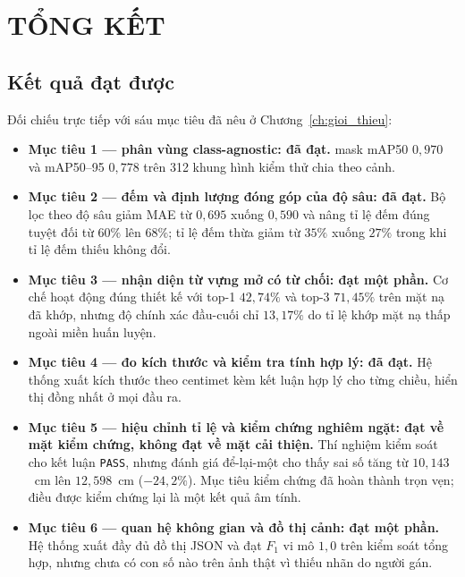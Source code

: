 \chapter{TỔNG KẾT}
\label{ch:tong_ket}

\section{Kết quả đạt được}

Đối chiếu trực tiếp với sáu mục tiêu đã nêu ở Chương~\ref{ch:gioi_thieu}:

\begin{itemize}[leftmargin=1.5cm]
\item \textbf{Mục tiêu 1 --- phân vùng class-agnostic: đã đạt.} mask mAP50 $0{,}970$ và mAP50--95
$0{,}778$ trên 312 khung hình kiểm thử chia theo cảnh.

\item \textbf{Mục tiêu 2 --- đếm và định lượng đóng góp của độ sâu: đã đạt.} Bộ lọc theo độ sâu
giảm MAE từ $0{,}695$ xuống $0{,}590$ và nâng tỉ lệ đếm đúng tuyệt đối từ $60\%$ lên $68\%$; tỉ
lệ đếm thừa giảm từ $35\%$ xuống $27\%$ trong khi tỉ lệ đếm thiếu không đổi.

\item \textbf{Mục tiêu 3 --- nhận diện từ vựng mở có từ chối: đạt một phần.} Cơ chế hoạt động
đúng thiết kế với top-1 $42{,}74\%$ và top-3 $71{,}45\%$ trên mặt nạ đã khớp, nhưng độ chính xác
đầu-cuối chỉ $13{,}17\%$ do tỉ lệ khớp mặt nạ thấp ngoài miền huấn luyện.

\item \textbf{Mục tiêu 4 --- đo kích thước và kiểm tra tính hợp lý: đã đạt.} Hệ thống xuất kích
thước theo centimet kèm kết luận hợp lý cho từng chiều, hiển thị đồng nhất ở mọi đầu ra.

\item \textbf{Mục tiêu 5 --- hiệu chỉnh tỉ lệ và kiểm chứng nghiêm ngặt: đạt về mặt kiểm chứng,
không đạt về mặt cải thiện.} Thí nghiệm kiểm soát cho kết luận \texttt{PASS}, nhưng đánh giá
để-lại-một cho thấy sai số tăng từ $10{,}143$~cm lên $12{,}598$~cm ($-24{,}2\%$). Mục tiêu kiểm
chứng đã hoàn thành trọn vẹn; điều được kiểm chứng lại là một kết quả âm tính.

\item \textbf{Mục tiêu 6 --- quan hệ không gian và đồ thị cảnh: đạt một phần.} Hệ thống xuất đầy
đủ đồ thị JSON và đạt $F_1$ vi mô $1{,}0$ trên kiểm soát tổng hợp, nhưng chưa có con số nào trên
ảnh thật vì thiếu nhãn do người gán.
\end{itemize}

